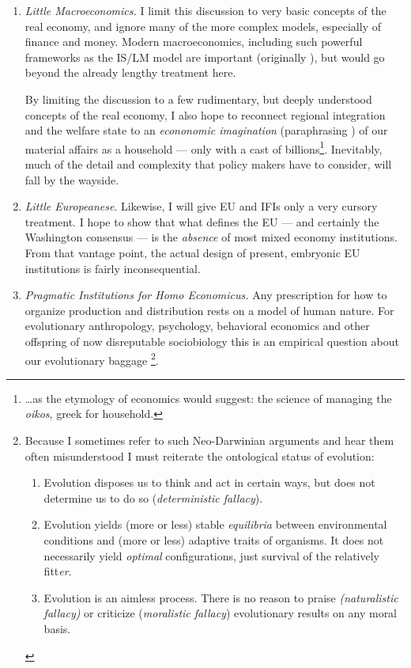 \documentclass[11pt,a4paper,oneside,openright]{article}
\begin{document}
\begin{enumerate}
	\item \label{it:little_macroeconomics} \emph{Little Macroeconomics.} 
		I limit this discussion to very basic concepts of the real economy, and ignore many of the more complex models, especially of finance and money. 
		Modern macroeconomics, including such powerful frameworks as the IS/LM model are important (originally \citealt{Hicks1937}), but would go beyond the already lengthy treatment here. 

	By limiting the discussion to a few rudimentary, but deeply understood concepts of the real economy, I also hope to reconnect regional integration and the welfare state to an \emph{econonomic imagination} (paraphrasing \citealt{Mills-1959-aa}) of our material affairs as a household --- only with a cast of billions\footnote
		{\ldots as the etymology of economics would suggest: 
		the science of managing the \emph{oikos}, greek for household.}. 
	Inevitably, much of the detail and complexity that policy makers have to consider, will fall by the wayside. 

	\item \label{it:little_europeanese} \emph{Little Europeanese}. 
		Likewise, I will give \gls{EU} and \glspl{IFI}  only a very cursory treatment. 
		I hope to show that what defines the \gls{EU} --- and certainly the Washington consensus --- is the \emph{absence} of most mixed economy institutions. 
		From that vantage point, the actual design of present, embryonic \gls{EU} institutions is fairly inconsequential.

	\item \label{it:homo_economicus} \emph{Pragmatic Institutions for Homo Economicus.} 
		Any prescription for how to organize production and distribution rests on a model of human nature. 
		For evolutionary anthropology, psychology, behavioral economics and other offspring of now disreputable \citep{Wright1994} sociobiology \citep{Wilson1975} this is an empirical question about our evolutionary baggage
			\footnote{
				Because I sometimes refer to such Neo-Darwinian arguments \citep{Wright1994} and hear them often misunderstood I must reiterate the ontological status of evolution:
				\begin{enumerate}
					\item Evolution disposes us to think and act in certain ways, but does not determine us to do so (\emph{deterministic fallacy}).
					\item Evolution yields (more or less) stable \emph{equilibria} between environmental conditions and (more or less) adaptive traits of organisms. 
					It does not necessarily yield \emph{optimal} configurations, just survival of the relatively fitt\emph{er}. 
					\item Evolution is an aimless process. 
						There is no reason to praise \emph{(naturalistic fallacy)} or criticize (\emph{moralistic fallacy}) evolutionary results on any moral basis.
		\end{enumerate} 
			}.
	

\end{enumerate}
\end{document}
